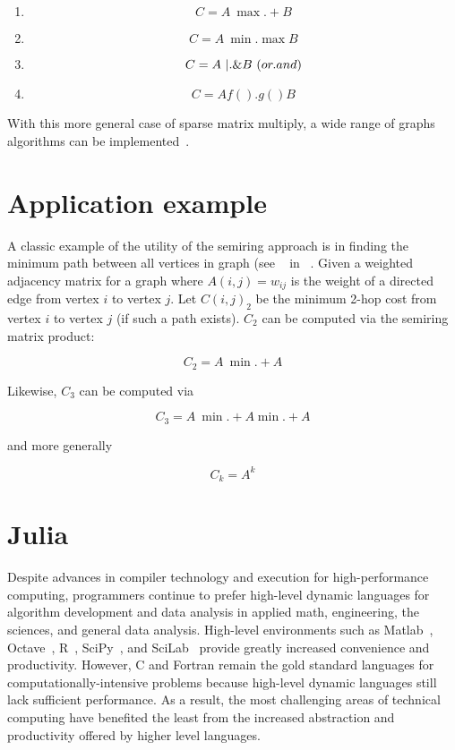 \documentclass[conference]{IEEEtran}
\begin{document}
\begin{enumerate}
\item $$C = A \ {\max.+} B$$
\item $$C = A \ \min.\max B$$
\item $$C = A \ |.\& B \ ({\mbox or.and})$$
\item $$C = A f().g() B $$
\end{enumerate}

With this more general case of sparse matrix multiply, a wide range of graphs algorithms can be implemented~\cite{KepnerGilbertBook}.

\section{Application example}

A classic example of the utility of the semiring approach is in
finding the minimum path between all vertices in graph (see
~\cite{Rader} in ~\cite{KepnerGilbertBook}.  Given a weighted
adjacency matrix for a graph where $A(i,j) = w_{ij}$ is the weight of
a directed edge from vertex $i$ to vertex $j$.  Let $C(i,j)_2$ be the
minimum 2-hop cost from vertex $i$ to vertex $j$ (if such a path
exists).  $C_2$ can be computed via the semiring matrix product:

$$C_2 = A \ \min.+ A$$

Likewise, $C_3$ can be computed via

$$C_3 = A\  \min.+ A \min.+ A$$

and more generally

$$C_k = A^k$$

\section{Julia}

Despite advances in compiler technology and execution for
high-performance computing, programmers continue to prefer high-level
dynamic languages for algorithm development and data analysis in
applied math, engineering,  the sciences, and general data analysis. High-level environments
such as Matlab~\cite{matlab}, Octave~\cite{Octave}, R~\cite{Rlang},
SciPy~\cite{numpy}, and SciLab~\cite{scilab} provide greatly increased
convenience and productivity. However, C and Fortran remain the gold
standard languages for computationally-intensive problems because
high-level dynamic languages still lack sufficient performance. As a
result, the most challenging areas of technical computing have
benefited the least from the increased abstraction and productivity
offered by higher level languages.
\end{document}
